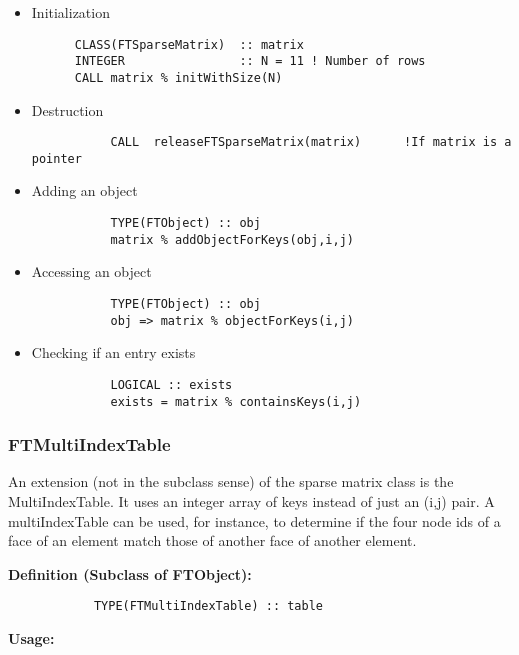 \documentclass[9pt]{article}
\begin{document}
\begin{itemize}
        \item Initialization
		{\color{blue}\begin{verbatim}
      CLASS(FTSparseMatrix)  :: matrix
      INTEGER                :: N = 11 ! Number of rows
      CALL matrix % initWithSize(N)
	\end{verbatim}}
	
        \item Destruction
		{\color{blue}\begin{verbatim}
           CALL  releaseFTSparseMatrix(matrix)      !If matrix is a pointer
	\end{verbatim}}
	
        \item Adding an object

	{\color{blue}\begin{verbatim}
           TYPE(FTObject) :: obj
           matrix % addObjectForKeys(obj,i,j)
	\end{verbatim}}
	
        \item Accessing an object

	{\color{blue}\begin{verbatim}
           TYPE(FTObject) :: obj
           obj => matrix % objectForKeys(i,j)
	\end{verbatim}}
	
        \item Checking if an entry exists
	{\color{blue}\begin{verbatim}
           LOGICAL :: exists
           exists = matrix % containsKeys(i,j)
	\end{verbatim}}
	
\end{itemize}
\subsubsection{FTMultiIndexTable}
An extension (not in the subclass sense) of the sparse matrix class is the MultiIndexTable. It uses an integer array
of keys instead of just an (i,j) pair. A multiIndexTable can be used, for instance, to determine if the four node ids of
a face of an element match those of another face of another element.

     {\bf Definition (Subclass of FTObject):}
	{\color{blue}\begin{verbatim}
        	TYPE(FTMultiIndexTable) :: table
	\end{verbatim}}
     {\bf Usage:}
\end{document}
